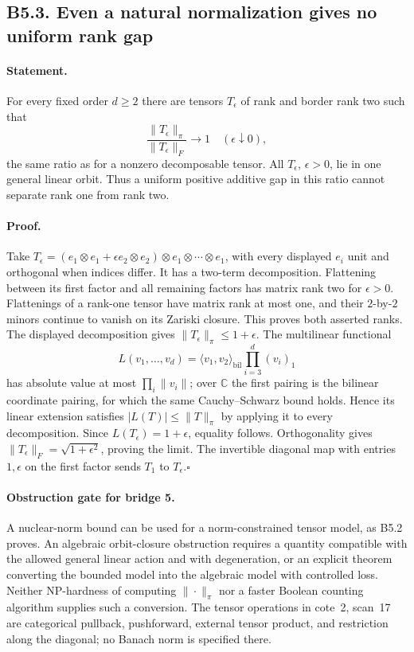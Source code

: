 \documentclass[11pt,a4paper]{article}
\begin{document}
\subsection*{B5.3. Even a natural normalization gives no uniform rank gap}
\paragraph{Statement.}
For every fixed order $d\geq2$ there are tensors $T_\epsilon$ of rank
and border rank two such that
\[
 \frac{\|T_\epsilon\|_\pi}{\|T_\epsilon\|_F}\longrightarrow1
 \quad(\epsilon\downarrow0),
\]
the same ratio as for a nonzero decomposable tensor.  All
$T_\epsilon$, $\epsilon>0$, lie in one general linear orbit.  Thus a
uniform positive additive gap in this ratio cannot separate rank one
from rank two.
\paragraph{Proof.}
Take
$T_\epsilon=(e_1\otimes e_1+\epsilon e_2\otimes e_2)\otimes
e_1\otimes\cdots\otimes e_1$, with every displayed $e_i$ unit and
orthogonal when indices differ.  It has a two-term decomposition.
Flattening between its first factor and all remaining factors has
matrix rank two for $\epsilon>0$.  Flattenings of a rank-one tensor
have matrix rank at most one, and their $2$-by-$2$ minors continue to
vanish on its Zariski closure.  This proves both asserted ranks.
The displayed decomposition gives
$\|T_\epsilon\|_\pi\leq1+\epsilon$.
The multilinear functional
\[
 L(v_1,\ldots,v_d)=
   \langle v_1,v_2\rangle_{\mathrm{bil}}
       \prod_{i=3}^d(v_i)_1
\]
has absolute value at most $\prod_i\|v_i\|$; over $\mathbb C$ the
first pairing is the bilinear coordinate pairing, for which the same
Cauchy--Schwarz bound holds.  Hence its linear extension satisfies
$|L(T)|\leq\|T\|_\pi$ by applying it to every decomposition.
Since $L(T_\epsilon)=1+\epsilon$, equality follows.  Orthogonality
gives $\|T_\epsilon\|_F=\sqrt{1+\epsilon^2}$, proving the limit.
The invertible diagonal map with entries $1,\epsilon$ on the first
factor sends $T_1$ to $T_\epsilon$.\hfill$\square$

\paragraph{Obstruction gate for bridge 5.}
A nuclear-norm bound can be used for a norm-constrained tensor model,
as B5.2 proves.  An algebraic orbit-closure obstruction requires a
quantity compatible with the allowed general linear action and with
degeneration, or an explicit theorem converting the bounded model into
the algebraic model with controlled loss.  Neither NP-hardness of
computing $\|\cdot\|_\pi$ nor a faster Boolean counting algorithm
supplies such a conversion.  The tensor operations in cote~2,
scan~17 are categorical pullback, pushforward, external tensor product,
and restriction along the diagonal; no Banach norm is specified there.
\end{document}
